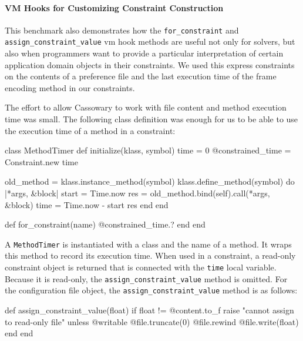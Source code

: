 
\paragraph{VM Hooks for Customizing Constraint Construction}
This benchmark also demonstrates how the 
\lstinline{for_constraint} and \lstinline{assign_constraint_value} 
\ac{vm} hook methods are
useful not only for solvers, but also when programmers want to provide a
particular interpretation of certain application domain objects in
their constraints. We used this express constraints on the contents of
a preference file and the last execution time of the frame encoding
method in our constraints.

The effort to allow Cassowary to work with file content and method
execution time was small. The following class definition was enough
for us to be able to use the execution time of a method in a
constraint:
\begin{code}
class MethodTimer
  def initialize(klass, symbol)
    time = 0
    @constrained_time = Constraint.new { time }

    old_method = klass.instance_method(symbol)
    klass.define_method(symbol) do |*args, &block|
      start = Time.now
      res = old_method.bind(self).call(*args, &block)
      time = Time.now - start
      res
    end
  end

  def for_constraint(name)
    @constrained_time.?
  end
end
\end{code}

A \lstinline{MethodTimer} is instantiated with a class and the name of
a method. It wraps this method to record its execution time. When used
in a constraint, a read-only constraint object is returned that is
connected with the \lstinline{time} local variable. Because it is
read-only, the \lstinline{assign_constraint_value} method is
omitted. For the configuration file object, the
\lstinline{assign_constraint_value} method is as follows:
\begin{code}
  def assign_constraint_value(float)
    if float != @content.to_f
      raise "cannot assign to read-only file" unless @writable
      @file.truncate(0)
      @file.rewind
      @file.write(float)
    end
  end
\end{code}

